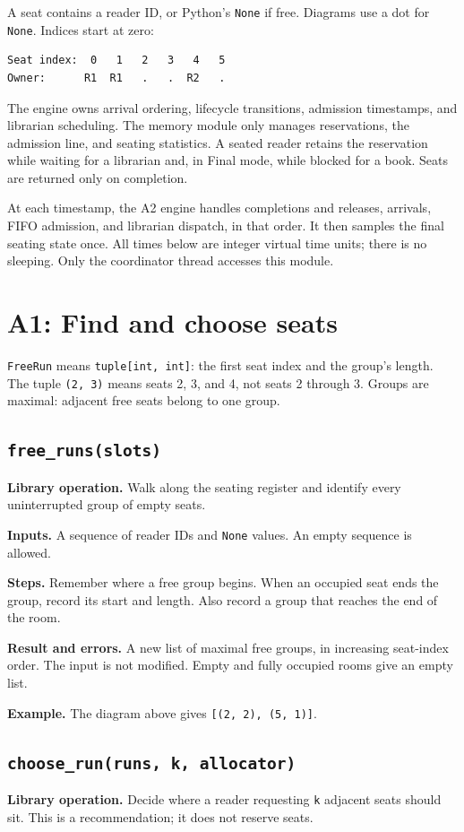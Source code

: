 \documentclass[11pt,a4paper]{article}
\newcommand{\routine}[2]{\subsection{\texorpdfstring{\texttt{#1}}{#2}}}
\newcommand{\librarymeaning}{\textbf{Library operation.} }
\newcommand{\arguments}{\textbf{Inputs.} }
\newcommand{\steps}{\textbf{Steps.} }
\newcommand{\result}{\textbf{Result and errors.} }
\newcommand{\example}{\textbf{Example.} }
\begin{document}
A seat contains a reader ID, or Python's \texttt{None} if free. Diagrams use
a dot for \texttt{None}. Indices start at zero:
\begin{lstlisting}
Seat index:  0   1   2   3   4   5
Owner:      R1  R1   .   .  R2   .
\end{lstlisting}

The engine owns arrival ordering, lifecycle transitions, admission timestamps,
and librarian scheduling. The memory module only manages reservations,
the admission line, and seating statistics. A seated reader retains the
reservation while waiting for a librarian and, in Final mode, while blocked
for a book. Seats are returned only on completion.

At each timestamp, the A2 engine handles completions and releases, arrivals,
FIFO admission, and librarian dispatch, in that order. It then samples the
final seating state once. All times below are integer virtual time units;
there is no sleeping. Only the coordinator thread accesses this module.

\section{A1: Find and choose seats}

\texttt{FreeRun} means \texttt{tuple[int, int]}: the first seat index and
the group's length. The tuple \texttt{(2, 3)} means seats 2, 3, and 4,
not seats 2 through 3. Groups are maximal: adjacent free seats belong to
one group.

\routine{free\_runs(slots)}{free runs}
\librarymeaning Walk along the seating register and identify every uninterrupted
group of empty seats.

\arguments A sequence of reader IDs and \texttt{None} values. An empty
sequence is allowed.

\steps Remember where a free group begins. When an occupied seat ends the
group, record its start and length. Also record a group that reaches the
end of the room.

\result A new list of maximal free groups, in increasing seat-index order.
The input is not modified. Empty and fully occupied rooms give an empty list.

\example The diagram above gives \texttt{[(2, 2), (5, 1)]}.

\routine{choose\_run(runs, k, allocator)}{choose run}
\librarymeaning Decide where a reader requesting \texttt{k} adjacent seats should
sit. This is a recommendation; it does not reserve seats.
\end{document}
